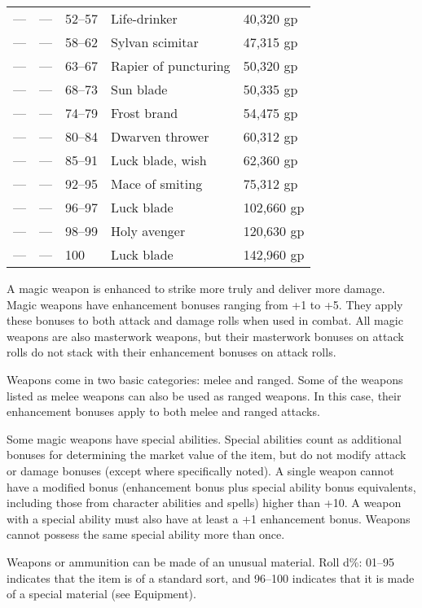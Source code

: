 \begin{table}[]
\begin{tabularx}{\linewidth}{lllXl}
--- & --- & 52--57 & Life-drinker & 40,320 gp\\
--- & --- & 58--62 & Sylvan scimitar & 47,315 gp\\
--- & --- & 63--67 & Rapier of puncturing & 50,320 gp\\
--- & --- & 68--73 & Sun blade & 50,335 gp\\
--- & --- & 74--79 & Frost brand & 54,475 gp\\
--- & --- & 80--84 & Dwarven thrower & 60,312 gp\\
--- & --- & 85--91 & Luck blade, wish & 62,360 gp\\
--- & --- & 92--95 & Mace of smiting & 75,312 gp\\
--- & --- & 96--97 & Luck blade & 102,660 gp\\
--- & --- & 98--99 & Holy avenger & 120,630 gp\\
--- & --- & 100 & Luck blade & 142,960 gp\\
\end{tabularx}
\end{table}
								
A magic weapon is enhanced to strike more truly and deliver more damage. Magic weapons have enhancement bonuses ranging from +1 to +5. They apply these bonuses to both attack and damage rolls when used in combat. All magic weapons are also masterwork weapons, but their masterwork bonuses on attack rolls do not stack with their enhancement bonuses on attack rolls.
				
Weapons come in two basic categories: melee and ranged. Some of the weapons listed as melee weapons can also be used as ranged weapons. In this case, their enhancement bonuses apply to both melee and ranged attacks.
				
Some magic weapons have special abilities. Special abilities count as additional bonuses for determining the market value of the item, but do not modify attack or damage bonuses (except where specifically noted). A single weapon cannot have a modified bonus (enhancement bonus plus special ability bonus equivalents, including those from character abilities and spells) higher than +10. A weapon with a special ability must also have at least a +1 enhancement bonus. Weapons cannot possess the same special ability more than once.
				
Weapons or ammunition can be made of an unusual material. Roll d\%: 01--95 indicates that the item is of a standard sort, and 96--100 indicates that it is made of a special material (see Equipment).
				
